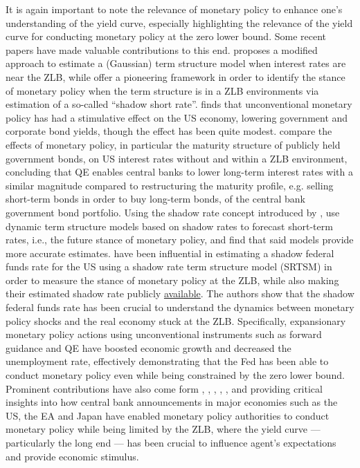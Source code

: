 It is again important to note the relevance of monetary policy to enhance one's understanding of the yield curve, especially highlighting the relevance of the yield curve for conducting monetary policy at the zero lower bound. 
Some recent papers have made valuable contributions to this end. 
\citet{Krippner_2012} proposes a modified approach to estimate a (Gaussian) term structure model when interest rates are near the ZLB, while \citet{KRIPPNER2013135} offer a pioneering framework in order to identify the stance of monetary policy when the term structure is in a ZLB environments via estimation of a so-called ``shadow short rate''.
\citet{Wright_2012} finds that unconventional monetary policy has had a stimulative effect on the US economy, lowering government and corporate bond yields, though the effect has been quite modest. 
\citet{Hamilton_Wu_2012} compare the effects of monetary policy, in particular the maturity structure of publicly held government bonds, on US interest rates without and within a ZLB environment, concluding that QE enables central banks to lower long-term interest rates with a similar magnitude compared to restructuring the maturity profile, e.g. selling short-term bonds in order to buy long-term bonds, of the central bank government bond portfolio.
Using the shadow rate concept introduced by \citet{KRIPPNER2013135}, \citet{Bauer_Rudebusch_2016} use dynamic term structure models based on shadow rates to forecast short-term rates, i.e., the future stance of monetary policy, and find that said models provide more accurate estimates.
\citet{Wu_Xia_2016} have been influential in estimating a shadow federal funds rate for the US using a shadow rate term structure model (SRTSM) in order to measure the stance of monetary policy at the ZLB, while also making their estimated shadow rate publicly \href{https://www.atlantafed.org/cqer/research/wu-xia-shadow-federal-funds-rate}{available}. 
The authors show that the shadow federal funds rate has been crucial to understand the dynamics between monetary policy shocks and the real economy stuck at the ZLB. Specifically, expansionary monetary policy actions using unconventional instruments such as forward guidance and QE have boosted economic growth and decreased the unemployment rate, effectively demonstrating that the Fed has been able to conduct monetary policy even while being constrained by the zero lower bound. 
%
Prominent contributions have also come form \citet{gurkaynak2005actions}, \citet{Nakamura_2018}, \citet{ALTAVILLA2019162}, \citet{jarocinski2020deconstructing}, \citet{SWANSON202132}, \citet{bauer_swanson_2023} and \citet{NAKAMURA2024101300} providing critical insights into how central bank announcements in major economies such as the US, the EA and Japan have enabled monetary policy authorities to conduct monetary policy while being limited by the ZLB, where the yield curve --- particularly the long end --- has been crucial to influence agent's expectations and provide economic stimulus. 

